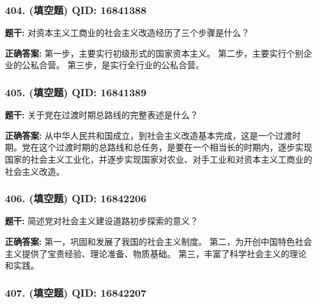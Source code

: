 \documentclass[12pt,UTF8]{ctexart}
\begin{document}
\vspace{0.3em}\hrulefill\vspace{0.7em}

\subsubsection*{404. (填空题) \small QID: 16841388}

\textbf{题干:}
对资本主义工商业的社会主义改造经历了三个步骤是什么？

\textbf{正确答案:}
第一步，主要实行初级形式的国家资本主义。
第二步，主要实行个别企业的公私合营。
第三步，是实行全行业的公私合营。

\vspace{0.3em}\hrulefill\vspace{0.7em}

\subsubsection*{405. (填空题) \small QID: 16841389}

\textbf{题干:}
关于党在过渡时期总路线的完整表述是什么？

\textbf{正确答案:}
从中华人民共和国成立，到社会主义改造基本完成，这是一个过渡时期。党在这个过渡时期的总路线和总任务，是要在一个相当长的时期内，逐步实现国家的社会主义工业化，并逐步实现国家对农业、对手工业和对资本主义工商业的社会主义改造。

\vspace{0.3em}\hrulefill\vspace{0.7em}

\subsubsection*{406. (填空题) \small QID: 16842206}

\textbf{题干:}
简述党对社会主义建设道路初步探索的意义？

\textbf{正确答案:}
第一，巩固和发展了我国的社会主义制度。
第二，为开创中国特色社会主义提供了宝贵经验、理论准备、物质基础。
第三，丰富了科学社会主义的理论和实践。

\vspace{0.3em}\hrulefill\vspace{0.7em}

\subsubsection*{407. (填空题) \small QID: 16842207}
\end{document}
